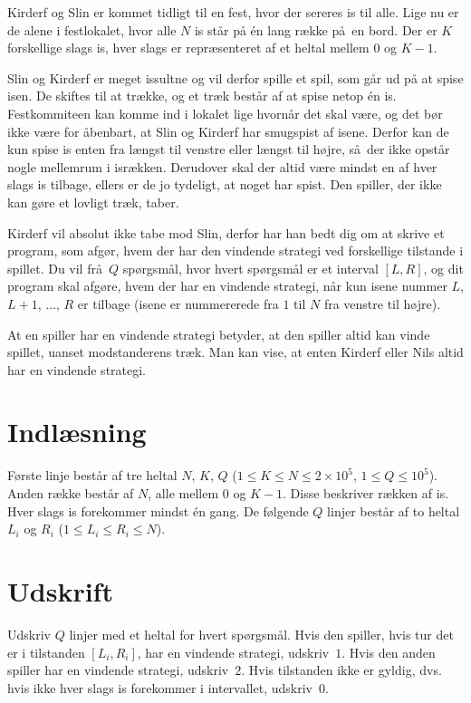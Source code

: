 
Kirderf og Slin er kommet tidligt til en fest, hvor der sereres is til alle.
Lige nu er de alene i festlokalet, hvor alle $N$ is står på én lang række på en bord.
Der er $K$ forskellige slags is, hver slags er repræsenteret af et heltal mellem $0$ og $K-1$.


Slin og Kirderf er meget issultne og vil derfor spille et spil, som går ud på at spise isen.
De skiftes til at trække, og et træk består af at spise netop én is.
Festkommiteen kan komme ind i lokalet lige hvornår det skal være, og det bør ikke være for åbenbart, at Slin og Kirderf har smugspist af isene.
Derfor kan de kun spise is enten fra længst til venstre eller længst til højre, så der ikke opstår nogle mellemrum i isrækken.
Derudover skal der altid være mindst en af hver slags is tilbage, ellers er de jo tydeligt, at noget har spist.
Den spiller, der ikke kan gøre et lovligt træk, taber.

Kirderf vil absolut ikke tabe mod Slin, derfor har han bedt dig om at skrive et program, som afgør, hvem der har den vindende strategi ved forskellige tilstande i spillet.
Du vil frå $Q$ spørgsmål, hvor hvert spørgsmål er et interval $[L,R]$, og dit program skal afgøre, hvem der har en vindende strategi, når kun isene nummer $L$, $L+1$, $\dots$, $R$ er tilbage (isene er nummererede fra $1$ til $N$ fra venstre til højre).

At en spiller har en vindende strategi betyder, at den spiller altid kan vinde spillet, uanset modstanderens træk.
Man kan vise, at enten Kirderf eller Nils altid har en vindende strategi.

\section*{Indlæsning}

Første linje består af tre heltal $N$, $K$, $Q$ ($1 \le K \le N \le 2 \times 10^5$, $1 \le Q \le 10^5$).
Anden række består af $N$, alle mellem $0$ og $K-1$.
Disse beskriver rækken af is.
Hver slags is forekommer mindst én gang.
De følgende $Q$ linjer består af  to heltal $L_i$ og $R_i$ ($1 \le L_i \le R_i \le N$).

\section*{Udskrift}

Udskriv $Q$ linjer med et heltal for hvert spørgsmål.
Hvis den spiller, hvis tur det er i tilstanden $[L_i, R_i]$, har en vindende strategi, udskriv~$1$.
Hvis den anden spiller har en vindende strategi, udskriv~$2$.
Hvis tilstanden ikke er gyldig, dvs. hvis ikke hver slags is forekommer i intervallet, udskriv~$0$.

